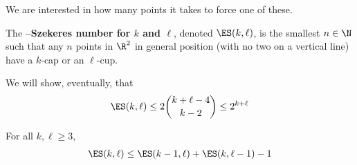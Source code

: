 We are interested in how many points it takes to force one of these.

\begin{boxdefinition}
    The \textbf{\Erdos--Szekeres number for $k$ and $\ell$}, denoted $\ES(k, \ell)$, is the smallest $n \in \N$ such that any $n$ points in $\R^2$ in general position (with no two on a vertical line) have a $k$-cap or an $\ell$-cup.
\end{boxdefinition}

We will show, eventually, that
\begin{align*}
    \ES(k, \ell) \le 2\binom{k + \ell - 4}{k - 2} \le 2^{k + \ell}
\end{align*}

\begin{boxlemma}\label{Ch2:Lemma:ES_Recursion}
    For all $k, \ell \geq 3$,
    \begin{align*}
        \ES(k, \ell) \le \ES(k - 1, \ell) + \ES(k, \ell - 1) - 1
    \end{align*}
\end{boxlemma}
